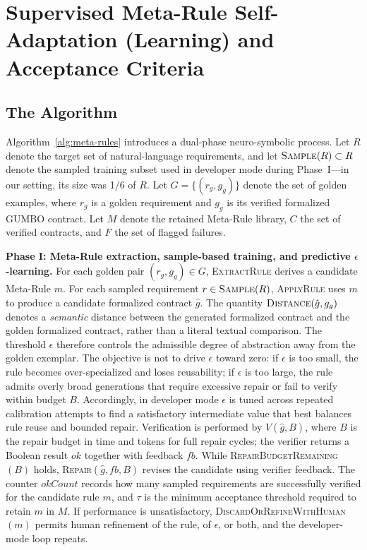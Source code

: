 \documentclass[conference]{IEEEtran}
\begin{document}
\section{Supervised Meta-Rule Self-Adaptation (Learning) and Acceptance Criteria}
\label{sec:meta-learning}
\subsection{The Algorithm}
\label{sec:algorithm-loop}
Algorithm~\ref{alg:meta-rules} introduces a dual-phase neuro-symbolic process. Let $R$ denote the target set of natural-language requirements, and let $\textsc{Sample}(R)\subset R$ denote the sampled training subset used in developer mode during Phase~I---in our setting, its size was 1/6 of $R$. Let $G=\{(r_g,g_g)\}$ denote the set of golden examples, where $r_g$ is a golden requirement and $g_g$ is its verified formalized GUMBO contract. Let $M$ denote the retained Meta-Rule library, $C$ the set of verified contracts, and $F$ the set of flagged failures.

\textbf{Phase I: Meta-Rule extraction, sample-based training, and predictive $\epsilon$-learning.}
For each golden pair $(r_g,g_g)\in G$, \textsc{ExtractRule} derives a candidate Meta-Rule $m$. For each sampled requirement $r\in \textsc{Sample}(R)$, \textsc{ApplyRule} uses $m$ to produce a candidate formalized contract $\hat{g}$. The quantity $\textsc{Distance}(\hat{g},g_g)$ denotes a \emph{semantic} distance between the generated formalized contract and the golden formalized contract, rather than a literal textual comparison. The threshold $\epsilon$ therefore controls the admissible degree of abstraction away from the golden exemplar. The objective is not to drive $\epsilon$ toward zero: if $\epsilon$ is too small, the rule becomes over-specialized and loses reusability; if $\epsilon$ is too large, the rule admits overly broad generations that require excessive repair or fail to verify within budget $B$. Accordingly, in developer mode $\epsilon$ is tuned across repeated calibration attempts to find a satisfactory intermediate value that best balances rule reuse and bounded repair. Verification is performed by $V(\hat{g},B)$, where $B$ is the repair budget in time and tokens for full repair cycles; the verifier returns a Boolean result $ok$ together with feedback $fb$. While \textsc{RepairBudgetRemaining}$(B)$ holds, \textsc{Repair}$(\hat{g},fb,B)$ revises the candidate using verifier feedback. The counter $okCount$ records how many sampled requirements are successfully verified for the candidate rule $m$, and $\tau$ is the minimum acceptance threshold required to retain $m$ in $M$. If performance is unsatisfactory, \textsc{DiscardOrRefineWithHuman}$(m)$ permits human refinement of the rule, of $\epsilon$, or both, and the developer-mode loop repeats.
\end{document}
